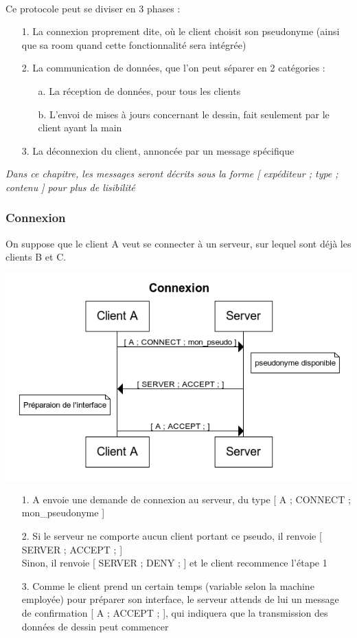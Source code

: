 \documentclass[a4paper,11pt]{article}
\begin{document}
\paragraph{}Ce protocole peut se diviser en 3 phases : 
\begin{itemize}
	\item[1.] La connexion proprement dite, où le client choisit son pseudonyme (ainsi que sa room quand cette fonctionnalité sera intégrée)
	\item[2.] La communication de données, que l'on peut séparer en 2 catégories :
	\begin{itemize}
		\item[a.] La réception de données, pour tous les clients
		\item[b.] L'envoi de mises à jours concernant le dessin, fait seulement par le client ayant la main
	\end{itemize}
	\item[3.] La déconnexion du client, annoncée par un message spécifique
\end{itemize}

\textit{Dans ce chapitre, les messages seront décrits sous la forme [ expéditeur ; type ; contenu ] pour plus de lisibilité}

\subsubsection{Connexion}
On suppose que le client A veut se connecter à un serveur, sur lequel sont déjà les clients B et C.

\includegraphics[scale=1]{image/Connexion.png}
\begin{itemize}
	\item[1.] A envoie une demande de connexion au serveur, du type [ A ; CONNECT ; mon\_pseudonyme ]
	\item[2.] Si le serveur ne comporte aucun client portant ce pseudo, il renvoie [ SERVER ; ACCEPT ; ] \\
	Sinon, il renvoie [ SERVER ; DENY ; ] et le client recommence l'étape 1
	\item[3.] Comme le client prend un certain temps (variable selon la machine employée) pour préparer son interface, le serveur attends de lui un message de confirmation [ A ; ACCEPT ; ], qui indiquera que la transmission des données de dessin peut commencer
\end{itemize}
\end{document}
